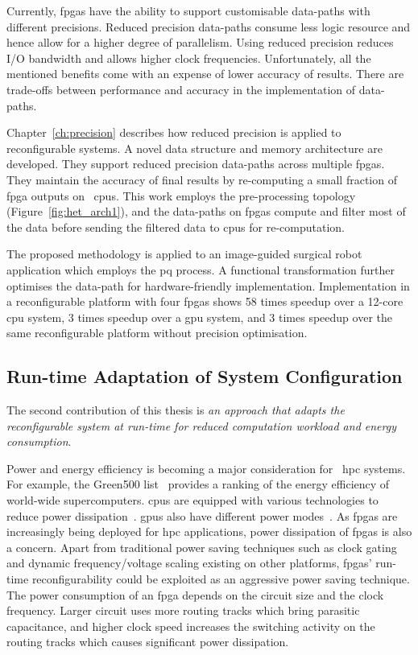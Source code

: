 Currently, \glspl{fpga} have the ability to support customisable data-paths with different precisions.
Reduced precision data-paths consume less logic resource and hence allow for a higher degree of parallelism.
Using reduced precision reduces I/O bandwidth and allows higher clock frequencies.
Unfortunately, all the mentioned benefits come with an expense of lower accuracy of results.
There are trade-offs between performance and accuracy in the implementation of data-paths.

Chapter~\ref{ch:precision} describes how reduced precision is applied to reconfigurable systems.
A novel data structure and memory architecture are developed.
They support reduced precision data-paths across multiple \glspl{fpga}.
They maintain the accuracy of final results by re-computing a small fraction of \gls{fpga} outputs on ~\glspl{cpu}.
This work employs the pre-processing topology (Figure~\ref{fig:het_arch1}), and the data-paths on \glspl{fpga} compute and filter most of the data before sending the filtered data to \glspl{cpu} for re-computation.

The proposed methodology is applied to an image-guided surgical robot application which employs the \gls{pq} process.
A functional transformation further optimises the data-path for hardware-friendly implementation.
Implementation in a reconfigurable platform with four \glspl{fpga} shows 58 times speedup over a 12-core \gls{cpu} system, 3 times speedup over a \gls{gpu} system, and 3 times speedup over the same reconfigurable platform without precision optimisation.

\subsection{Run-time Adaptation of System Configuration}

The second contribution of this thesis is \textit{an approach that adapts the reconfigurable system at run-time for reduced computation workload and energy consumption}.

Power and energy efficiency is becoming a major consideration for ~\gls{hpc} systems.
For example, the Green500 list~\cite{green500} provides a ranking of the energy efficiency of world-wide supercomputers.
\glspl{cpu} are equipped with various technologies to reduce power dissipation~\cite{intelsleep,intelturboboost}.
\glspl{gpu} also have different power modes~\cite{amdpower,nvidiapower}.
As \glspl{fpga} are increasingly being deployed for \gls{hpc} applications, power dissipation of \glspl{fpga} is also a concern.
Apart from traditional power saving techniques such as clock gating and dynamic frequency/voltage scaling existing on other platforms, \glspl{fpga}' run-time reconfigurability could be exploited as an aggressive power saving technique.
The power consumption of an \gls{fpga} depends on the circuit size and the clock frequency.
Larger circuit uses more routing tracks which bring parasitic capacitance,
and higher clock speed increases the switching activity on the routing tracks which causes significant power dissipation.

